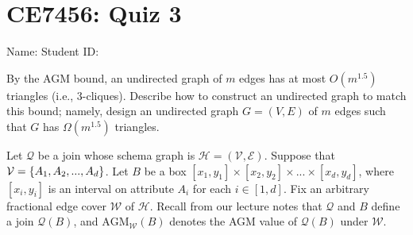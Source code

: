 


\usepackage{amsfonts, amsmath, amssymb, amsthm}
\usepackage{comment}
\usepackage{graphicx}
\usepackage{ifthen}
\usepackage{latexsym}
\usepackage[normalem]{ulem}



\def\agm{\text{AGM}}
\def\B{\mathcal{B}}
\def\E{\mathcal{E}}
\def\H{\mathcal{H}}
\def\Q{\mathcal{Q}}
\def\V{\mathcal{V}}
\def\W{\mathscr{W}}




\section*{CE7456: Quiz 3}

\noindent Name:  \hspace{50mm}
Student ID:


\extraspacing



 By the AGM bound, an undirected graph of $m$ edges has at most $O(m^{1.5})$ triangles (i.e., 3-cliques). Describe how to construct an undirected graph to match this bound; namely, design an undirected graph $G = (V, E)$ of $m$ edges such that $G$ has $\Omega(m^{1.5})$ triangles.

\pagebreak

 Let $\Q$ be a join whose schema graph is $\H = (\V, \E)$. Suppose that $\V = \set{A_1, A_2, ..., A_d}$. Let $B$ be a box $[x_1, y_1] \times [x_2, y_2] \times ... \times [x_d, y_d]$, where $[x_i, y_i]$ is an interval on attribute $A_i$ for each $i \in [1, d]$. Fix an arbitrary fractional edge cover $\W$ of $\H$. Recall from our lecture notes that $\Q$ and $B$ define a join $\Q(B)$, and $\agm_\W(B)$ denotes the AGM value of $\Q(B)$ under $\W$.

